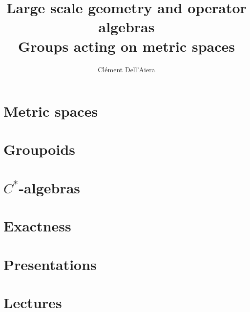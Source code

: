 \documentclass[a4paper,12pt]{book}
\title{\textbf{Large scale geometry and operator algebras}\\
Groups acting on metric spaces}
\date{}
\author{ Clément Dell'Aiera}
\begin{document}
\maketitle

\pagestyle{plain}
\tableofcontents

\pagestyle{fancy}
\chapter{Metric spaces}


\chapter{Groupoids}


\chapter{$C^*$-algebras}


\chapter{Exactness}


\chapter{Presentations}


\chapter{Lectures}



 
\nocite{*}
\end{document}
